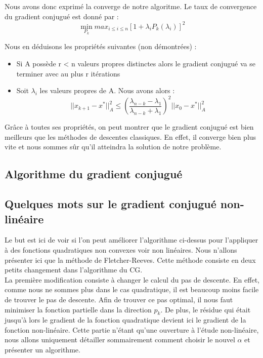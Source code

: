 Nous avons donc exprimé la converge de notre algoritme. Le taux de convergence du gradient conjugué est donné par : 
\begin{equation}
\min_{P_k}max_{i \leq i \leq n} [1 + \lambda_iP_k(\lambda_i)]^2
\end{equation}

Nous en déduisons les propriétés suivantes (non démontrées) : 
\begin{itemize}
	\item Si A possède r < n valeurs propres distinctes alors le gradient conjugué va se terminer avec au plus r itérations
	\item Soit $\lambda_i$ les valeurs propres de A. Nous avons alors : 
	\begin{equation}
	||x_{k+1} - x^*||^2_A \leq \left( \frac{\lambda_{n - k} - \lambda_1}{\lambda_{n - k} + \lambda_1} \right)^2 ||x_0 - x^*||^2_A
	\end{equation}
\end{itemize}

Grâce à toutes ses propriétés, on peut montrer que le gradient conjugué est bien meilleurs que les méthodes de descentes classiques. En effet, il converge bien plus vite et nous sommes sûr qu'il atteindra la solution de notre problème.
\subsection{Algorithme du gradient conjugué}
\subsection{Quelques mots sur le gradient conjugué non-linéaire}
Le but est ici de voir si l'on peut améliorer l'algorithme ci-dessus pour l'appliquer à des fonctions quadratiques non convexes voir non linéaires. Nous n'allons présenter ici que la méthode de Fletcher-Reeves. Cette méthode consiste en deux petits changement dans l'algorithme du CG. \\

La première modification consiste à changer le calcul du pas de descente. En effet, comme nous ne sommes plus dans le cas quadratique, il est beaucoup moins facile de trouver le pas de descente. Afin de trouver ce pas optimal, il nous faut minimiser la fonction partielle dans la direction $p_k$. De plus, le résidue qui était jusqu'à lors le gradient de la fonction quadratique devient ici le gradient de la fonction non-linéaire. Cette partie n'étant qu'une ouverture à l'étude non-linéaire, nous allons uniquement détailler sommairement comment choisir le nouvel $\alpha$ et présenter un algorithme. 

